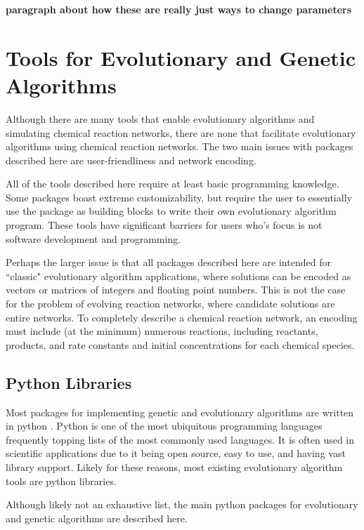 \documentclass[12pt]{report}
\begin{document}
\textbf{paragraph about how these are really just ways to change parameters}

\section{Tools for Evolutionary and Genetic Algorithms}
\label{section:tools_GA}
Although there are many tools that enable evolutionary algorithms and simulating chemical reaction networks, there are none that facilitate evolutionary algorithms using chemical reaction networks. The two main issues with packages described here are user-friendliness and network encoding.

All of the tools described here require at least basic programming knowledge. Some packages boast extreme customizability, but require the user to essentially use the package as building blocks to write their own evolutionary algorithm program. These tools have significant barriers for users who's focus is not software development and programming.

Perhaps the larger issue is that all packages described here are intended for ``classic" evolutionary algorithm applications, where solutions can be encoded as vectors or matrices of integers and floating point numbers. This is not the case for the problem of evolving reaction networks, where candidate solutions are entire networks. To completely describe a chemical reaction network, an encoding must include (at the minimum) numerous reactions, including reactants, products, and rate constants and initial concentrations for each chemical species.  

\subsection{Python Libraries}

Most packages for implementing genetic and evolutionary algorithms are written in python \cite{python3}. Python is one of the most ubiquitous programming languages frequently topping lists of the most commonly used languages. It is often used in scientific applications due to it being open source, easy to use, and having vast library support. Likely for these reasons, most existing evolutionary algorithm tools are python libraries.

Although likely not an exhaustive list, the main python packages for evolutionary and genetic algorithms are described here.
\end{document}
